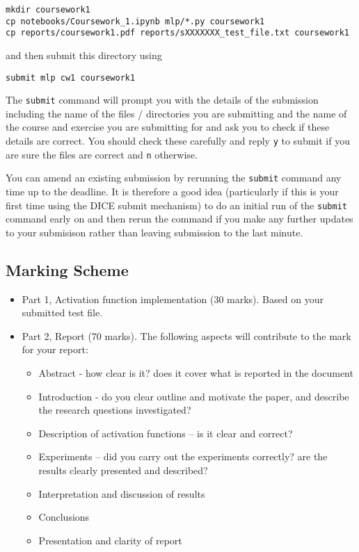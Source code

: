 \documentclass[11pt,]{article}
\begin{document}
\begin{verbatim}
mkdir coursework1
cp notebooks/Coursework_1.ipynb mlp/*.py coursework1
cp reports/coursework1.pdf reports/sXXXXXXX_test_file.txt coursework1
\end{verbatim}


and then submit this directory using

\begin{verbatim}
submit mlp cw1 coursework1
\end{verbatim}

The \texttt{submit} command will prompt you with the details of the
submission including the name of the files / directories you are
submitting and the name of the course and exercise you are submitting
for and ask you to check if these details are correct. You should check
these carefully and reply \texttt{y} to submit if you are sure the files
are correct and \texttt{n} otherwise.

You can amend an existing submission by rerunning the \texttt{submit}
command any time up to the deadline. It is therefore a good idea
(particularly if this is your first time using the DICE submit
mechanism) to do an initial run of the \texttt{submit} command early on
and then rerun the command if you make any further updates to your
submisison rather than leaving submission to the last minute.


\subsection{Marking Scheme}
\label{sec:marking-scheme}

\begin{itemize}
\item
  Part 1, Activation function implementation (30 marks). Based on your submitted test file.
\item
  Part 2, Report (70 marks).  The following aspects will contribute to the mark for your report:
  \begin{itemize}
    \item Abstract - how clear is it? does it cover what is reported in the document
    \item Introduction - do you clear outline and motivate the paper, and describe the research questions investigated?
    \item Description of activation functions -- is it clear and correct?
    \item Experiments -- did you carry out the experiments correctly?  are the results clearly presented and described?  
    \item Interpretation and discussion of results
    \item Conclusions
    \item Presentation and clarity of report 
  \end{itemize}
\end{itemize}



\end{document}
